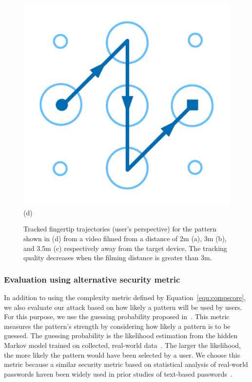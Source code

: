 \begin{figure}[!ht]
{\begin{minipage}[b]{0.19\textwidth}
                \includegraphics[width=\textwidth]{fig/distance-pattern.pdf}\\
                \centering  (d)
                \end{minipage}
            }

            \caption{Tracked fingertip trajectories (user's perspective) for the pattern shown in (d) from a video filmed from a distance of 2m (a), 3m (b), and 3.5m (c) respectively away from the target device. The tracking quality decreases when the filming distance is greater than 3m. }
            \label{fig:distance-show}
        \end{figure}

       \subsubsection{Evaluation using alternative security metric}
       \label{sec:eval_gussingp}
        In addition to using the complexity metric defined by Equation~\ref{equ:compscore}, we also evaluate our attack
        based on how likely a pattern will be used by users.  For this purpose, we use the
        guessing probability  proposed in~\cite{Heidt2016Refining}. This metric measures the pattern's strength by
        considering how likely a pattern is to be guessed. The guessing probability is the likelihood estimation from
        the hidden Markov model trained on collected, real-world data~\cite{uellenbeck2013quantifying}. The larger the
        likelihood, the more likely the pattern would have been
        selected by a user.  We choose this metric because a similar security metric
        based on statistical analysis of real-world passwords haven been widely used in prior studies of text-based
        passwords~\cite{Kelley:2012:GAM:2310656.2310715,Bonneau:2012:SGA:2310656.2310721}.

